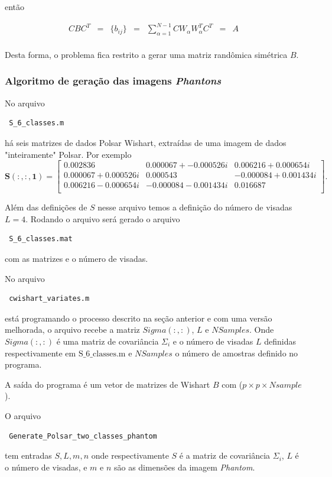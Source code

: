 \documentclass[12pt,a4paper]{article}
\begin{document}
então

\begin{equation}\label{eqn119}
\begin{array}{ccccccc}
	CBC^{T}&=&\{b_{ij}\}&=&\sum_{\alpha=1}^{N-1}CW_{\alpha}W_{\alpha}^{T}C^{T}&=&A \\
\end{array}
\end{equation}

Desta forma, o problema fica restrito a gerar uma matriz randômica simétrica $B$.

\subsubsection{Algoritmo de geração das imagens {\it Phantons}} 

No arquivo \begin{verbatim} S_6_classes.m \end{verbatim} há seis matrizes de dados Polsar Wishart, extraídas de uma imagem de dados "inteiramente" Polsar. Por exemplo  
$$
\mathbf{S(:, :, 1)} = \left[
\begin{array}{lll}
	0.002836  &0.000067+-0.000526i &0.006216+0.000654i\\
	0.000067+0.000526i &0.000543 & -0.000084+0.001434i\\
	0.006216-0.000654i& -0.000084-0.001434i & 0.016687\\
\end{array}
\right].
$$

Além das definições de $S$ nesse arquivo temos a definição do número de visadas $L=4$. Rodando o arquivo será gerado o arquivo \begin{verbatim} S_6_classes.mat \end{verbatim} com as matrizes e o número de visadas.

No arquivo \begin{verbatim} cwishart_variates.m \end{verbatim} está programando o processo descrito na seção anterior e com uma versão melhorada, o arquivo recebe a matriz  $Sigma(:,:)$, $L$ e  $NSamples$. Onde $Sigma(:,:)$ é uma matriz de covariância $\Sigma_i$ e o número de visadas $L$ definidas respectivamente em $\mbox{S\_6\_classes.m}$ e $NSamples$ o número de amostras definido no programa.

A saída do programa é um vetor de matrizes  de Wishart $B$ com ($p\times p \times Nsample$). 


O arquivo \begin{verbatim} Generate_Polsar_two_classes_phantom \end{verbatim} tem entradas $S, L, m, n$ onde respectivamente $S$ é a matriz de covariância $\Sigma_i$, $L$ é o número de visadas, e $m$ e $n$ são as dimensões da imagem {\it Phantom}.   
\end{document}
